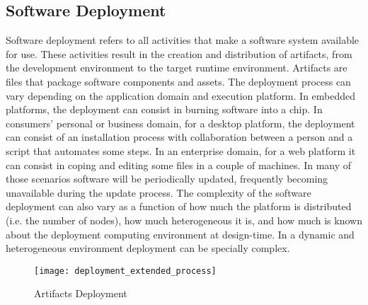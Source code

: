 \subsection{Software Deployment}

Software deployment refers to all activities that make a software system available for use\cite{carzaniga_characterization_1998}. These activities result
in the creation and distribution of artifacts,  from the development environment to the target runtime environment. Artifacts are files that package software components and assets. The deployment process can vary depending on the application domain and execution platform. In embedded platforms, the deployment can consist in burning software into a chip. In consumers' personal or business domain, for a desktop platform, the deployment can consist of an installation process with collaboration between a person and a script that automates some steps.
In an enterprise domain, for a web platform it can consist in coping and editing some files in a couple of machines. In many of those scenarios software will be periodically updated, frequently becoming unavailable during the update process.
The complexity of the software deployment can also vary as a function of how much the platform is distributed (i.e. the number of nodes), how much heterogeneous it is, and how much is known about the deployment computing environment at design-time. In a dynamic and heterogeneous environment deployment can be specially complex.

\label{sub:deployment}
\begin{figure}[!htb]
  \centering
  \texttt{[image: deployment\_extended\_process]}
  \caption{Artifacts Deployment}
  \label{fig:deployment_extended_process}
\end{figure}

